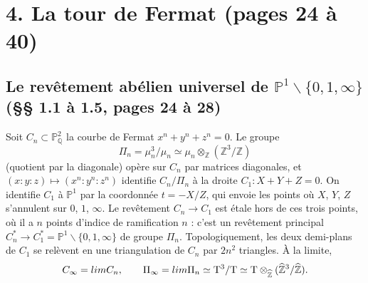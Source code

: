 \documentclass[11pt,a4paper]{article}
\begin{document}
\section*{4. La tour de Fermat (pages 24 à 40)}

\subsection*{Le revêtement abélien universel de $\mathbb{P}^{1} \smallsetminus
\{0, 1, \infty\}$ (§§ 1.1 à 1.5, pages 24 à 28)}

Soit $C_{n} \subset \mathbb{P}^{2}_{\mathbb{Q}}$ la courbe de Fermat $x^{n} +
y^{n} + z^{n} = 0$. Le groupe
\[
\Pi_{n} = \mu_{n}^{3}/\mu_{n} \simeq \mu_{n} \otimes_{\mathbb{Z}}
(\mathbb{Z}^{3}/\mathbb{Z})
\]
(quotient par la diagonale) opère sur $C_{n}$ par matrices diagonales, et
$(x : y : z) \mapsto (x^{n} : y^{n} : z^{n})$ identifie $C_{n}/\Pi_{n}$ à la droite
$C_{1} : X + Y + Z = 0$. On identifie $C_{1}$ à $\mathbb{P}^{1}$ par la
coordonnée $t = -X/Z$, qui envoie les points où $X$, $Y$, $Z$ s'annulent sur
$0$, $1$, $\infty$. Le revêtement $C_{n} \to C_{1}$ est étale hors de ces trois
points, où il a $n$ points d'indice de ramification $n$ : c'est un revêtement
principal $C_{n}^{*} \to C_{1}^{*} = \mathbb{P}^{1} \smallsetminus \{0, 1,
\infty\}$ de groupe $\Pi_{n}$. Topologiquement, les deux demi-plans de $C_{1}$
se relèvent en une triangulation de $C_{n}$ par $2n^{2}$ triangles. À la limite,
\[
C_{\infty} = \varprojlim C_{n}, \qquad
\Pi_{\infty} = \varprojlim \Pi_{n} \simeq \mathrm{T}^{3}/\mathrm{T} \simeq
\mathrm{T} \otimes_{\widehat{\mathbb{Z}}} (\widehat{\mathbb{Z}}^{3}/\widehat{\mathbb{Z}}).
\]
\end{document}
